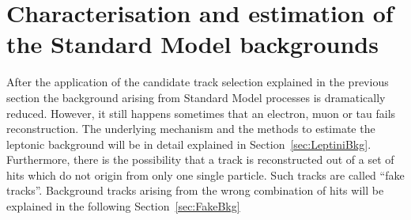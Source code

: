 \chapter{Characterisation and estimation of the Standard Model backgrounds}
\label{sec:BackgroundEstimation}
After the application of the candidate track selection explained in the previous section the background arising from Standard Model processes is dramatically reduced.
However, it still happens sometimes that an electron, muon or tau fails reconstruction.
The underlying mechanism and the methods to estimate the leptonic background will be in detail explained in Section~\ref{sec:LeptiniBkg}.
Furthermore, there is the possibility that a track is reconstructed out of a set of hits which do not origin from only one single particle.
Such tracks are called ``fake tracks''. 
Background tracks arising from the wrong combination of hits will be explained in the following Section~\ref{sec:FakeBkg}

